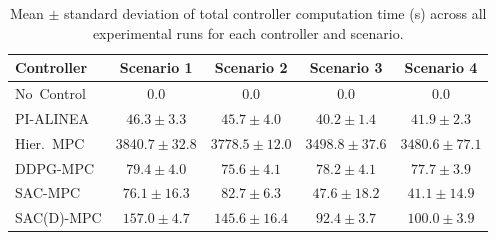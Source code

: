 \begin{table}[htbp]
\centering
\caption{Mean $\pm$ standard deviation of total controller computation time (s) across all experimental runs for each controller and scenario.}
\label{tab:comp_time_comparison}
\begin{tabular}{lcccc}
\toprule
Controller & Scenario 1 & Scenario 2 & Scenario 3 & Scenario 4 \\
\midrule
No~Control & $0.0$ & $0.0$ & $0.0$ & $0.0$ \\
PI-ALINEA & $46.3 \pm 3.3$ & $45.7 \pm 4.0$ & $40.2 \pm 1.4$ & $41.9 \pm 2.3$ \\
Hier.~MPC & $3840.7 \pm 32.8$ & $3778.5 \pm 12.0$ & $3498.8 \pm 37.6$ & $3480.6 \pm 77.1$ \\
DDPG-MPC & $79.4 \pm 4.0$ & $75.6 \pm 4.1$ & $78.2 \pm 4.1$ & $77.7 \pm 3.9$ \\
SAC-MPC & $76.1 \pm 16.3$ & $82.7 \pm 6.3$ & $47.6 \pm 18.2$ & $41.1 \pm 14.9$ \\
SAC(D)-MPC & $157.0 \pm 4.7$ & $145.6 \pm 16.4$ & $92.4 \pm 3.7$ & $100.0 \pm 3.9$ \\
\bottomrule
\end{tabular}
\end{table}
